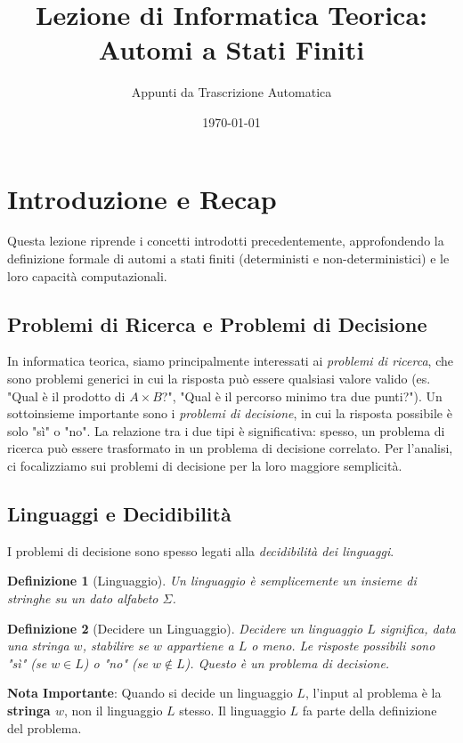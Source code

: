 \documentclass[a4paper]{article}
\title{Lezione di Informatica Teorica: Automi a Stati Finiti}
\author{Appunti da Trascrizione Automatica}
\date{\today}
\newtheorem{definition}{Definizione}[section]
\begin{document}
\maketitle
\tableofcontents
\newpage

\section{Introduzione e Recap}
Questa lezione riprende i concetti introdotti precedentemente, approfondendo la definizione formale di automi a stati finiti (deterministi e non-deterministici) e le loro capacità computazionali.

\subsection{Problemi di Ricerca e Problemi di Decisione}
In informatica teorica, siamo principalmente interessati ai \emph{problemi di ricerca}, che sono problemi generici in cui la risposta può essere qualsiasi valore valido (es. "Qual è il prodotto di $A \times B$?", "Qual è il percorso minimo tra due punti?").
Un sottoinsieme importante sono i \emph{problemi di decisione}, in cui la risposta possibile è solo "sì" o "no".
La relazione tra i due tipi è significativa: spesso, un problema di ricerca può essere trasformato in un problema di decisione correlato. Per l'analisi, ci focalizziamo sui problemi di decisione per la loro maggiore semplicità.

\subsection{Linguaggi e Decidibilità}
I problemi di decisione sono spesso legati alla \emph{decidibilità dei linguaggi}.
\begin{definition}[Linguaggio]
Un \emph{linguaggio} è semplicemente un insieme di stringhe su un dato alfabeto $\Sigma$.
\end{definition}

\begin{definition}[Decidere un Linguaggio]
\emph{Decidere un linguaggio $L$} significa, data una stringa $w$, stabilire se $w$ appartiene a $L$ o meno. Le risposte possibili sono "sì" (se $w \in L$) o "no" (se $w \notin L$). Questo è un problema di decisione.
\end{definition}

\noindent \textbf{Nota Importante}: Quando si decide un linguaggio $L$, l'input al problema è la \textbf{stringa $w$}, non il linguaggio $L$ stesso. Il linguaggio $L$ fa parte della definizione del problema.
\end{document}
